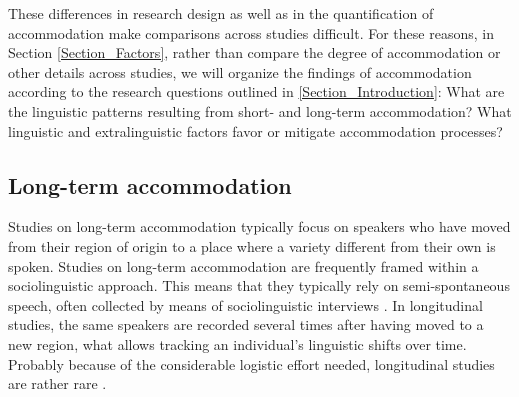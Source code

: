 \documentclass[output=paper,
modfonts
]{langscibook}
\begin{document}
These differences in research design as well as in the quantification of accommodation make comparisons across studies difficult. For these reasons, in Section \ref{Section_Factors}, rather than compare the degree of accommodation or other details across studies, we will organize the findings of accommodation according to the research questions outlined in \ref{Section_Introduction}: What are the linguistic patterns resulting from short- and long-term accommodation? What linguistic and extralinguistic factors favor or mitigate accommodation processes?
% 
% 
% 
% 
%


\subsection{Long-term accommodation}
Studies on long-term accommodation typically focus on speakers who have moved from their region of origin to a place where a variety different from their own is spoken. Studies on long-term accommodation are frequently framed within a sociolinguistic approach. This means that they typically rely on semi-spontaneous speech, often collected by means of sociolinguistic interviews \citep[][among many others]{shockey_all_1984, auer_subjective_1998, romera_prosodic_2013}. 
% 
% 
% 
% 
% 
%
% 
%
In longitudinal studies, the same speakers are recorded several times after having moved to a new region, what allows tracking an individual's linguistic shifts over time. Probably because of the considerable logistic effort needed, longitudinal studies are rather rare \citep[but see][]{shockey_all_1984,auer_subjective_1998,reubold_dissociating_2015}.
\end{document}
